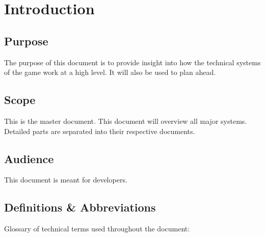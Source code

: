 \chapter{Introduction}

\section{Purpose}
The purpose of this document is to provide insight into how the technical systems of the game work at a high level. It will also be used to plan ahead.

\section{Scope}
This is the master document. This document will overview all major systems. Detailed parts are separated into their respective documents.

\section{Audience}
This document is meant for developers.

\section{Definitions \& Abbreviations}
Glossary of technical terms used throughout the document: